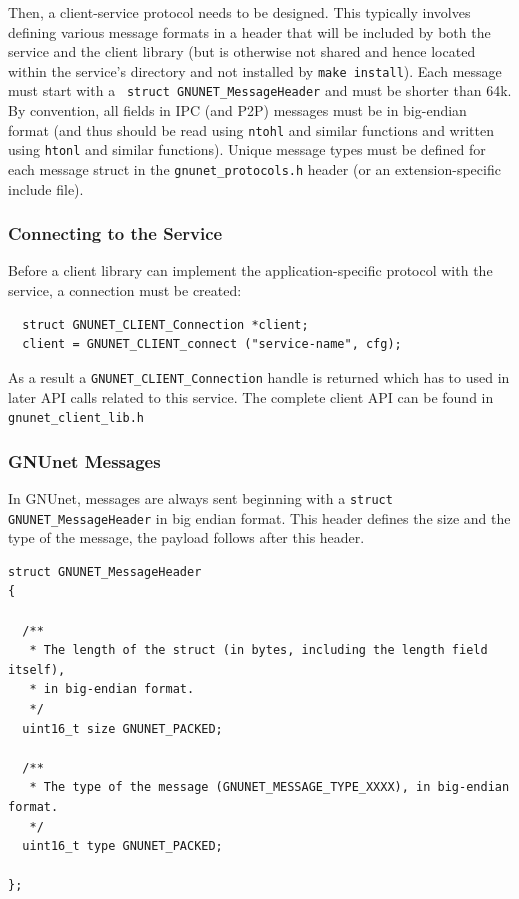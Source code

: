 \documentclass[10pt]{article}
\begin{document}
Then, a client-service protocol needs to be designed.  This typically
involves defining various message formats in a header that will be
included by both the service and the client library (but is otherwise
not shared and hence located within the service's directory and not
installed by {\tt make install}).  Each message must start with a {\tt
  struct GNUNET\_MessageHeader} and must be shorter than 64k.  By
convention, all fields in IPC (and P2P) messages must be in big-endian
format (and thus should be read using {\tt ntohl} and similar
functions and written using {\tt htonl} and similar functions).
Unique message types must be defined for each message struct in the
{\tt gnunet\_protocols.h} header (or an extension-specific include
file).

\subsubsection{Connecting to the Service}

Before a client library can implement the application-specific protocol
with the service, a connection must be created:

\lstset{language=c}
\begin{lstlisting}
  struct GNUNET_CLIENT_Connection *client;
  client = GNUNET_CLIENT_connect ("service-name", cfg);
\end{lstlisting}

As a result a {\tt GNUNET\_CLIENT\_Connection} handle is returned
which has to used in later API calls related to this service.
The complete client API can be found in {\tt gnunet\_client\_lib.h}

\subsubsection{GNUnet Messages}

In GNUnet, messages are always sent beginning with a {\tt struct GNUNET\_MessageHeader}
in big endian format. This header defines the size and the type of the
message, the payload follows after this header.

\lstset{language=c}
\begin{lstlisting}
struct GNUNET_MessageHeader
{

  /**
   * The length of the struct (in bytes, including the length field itself),
   * in big-endian format.
   */
  uint16_t size GNUNET_PACKED;

  /**
   * The type of the message (GNUNET_MESSAGE_TYPE_XXXX), in big-endian format.
   */
  uint16_t type GNUNET_PACKED;

};
\end{lstlisting}
\end{document}
